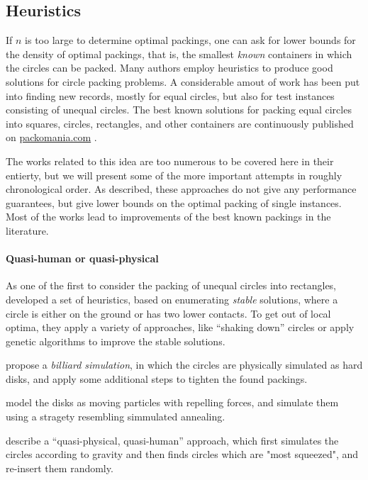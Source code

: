 \documentclass[a4paper,style=print,bibliography=totoc,nexus,lnum,extramargin]{tubsbook}
\begin{document}
\subsection{Heuristics}

If $n$ is too large to determine optimal packings, one can ask for lower bounds for the density of optimal packings, that is, the smallest \emph{known} containers in which the circles can be packed.
Many authors employ heuristics to produce good solutions for circle packing problems.
A considerable amout of work has been put into finding new records, mostly for equal circles, but also for test instances consisting of unequal circles. The best known solutions for packing equal circles into squares, circles, rectangles, and other containers are continuously published on \url{packomania.com} \cite{specht2015packomania}.

The works related to this idea are too numerous to be covered here in their entierty, but we will present some of the more important attempts in roughly chronological order. As described, these approaches do not give any performance guarantees, but give lower bounds on the optimal packing of single instances. Most of the works lead to improvements of the best known packings in the literature.

\paragraph{Quasi-human or quasi-physical}

As one of the first to consider the packing of unequal circles into rectangles, \textcite{GGL1995packing} developed a set of heuristics, based on enumerating \emph{stable} solutions, where a circle is either on the ground or has two lower contacts. To get out of local optima, they apply a variety of approaches, like “shaking down” circles or apply genetic algorithms to improve the stable solutions.

\textcite{GLNO1998dense} propose a \emph{billiard simulation}, in which the circles are physically simulated as hard disks, and apply some additional steps to tighten the found packings.

\textcite{BDGL2000improving} model the disks as moving particles with repelling forces, and simulate them using a stragety resembling simmulated annealing.

\textcite{WHZX2002improved} describe a “quasi-physical, quasi-human” approach, which first simulates the circles according to gravity and then finds circles which are "most squeezed", and re-insert them randomly.
\end{document}
